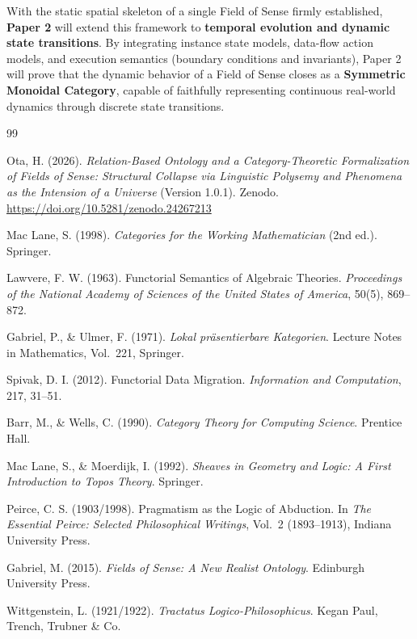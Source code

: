 \documentclass[11pt,a4paper]{article}
\theoremstyle{definition}
\theoremstyle{plain}
\theoremstyle{remark}
\begin{document}
With the static spatial skeleton of a single Field of Sense firmly established, \textbf{Paper 2} will extend this framework to \textbf{temporal evolution and dynamic state transitions}. By integrating instance state models, data-flow action models, and execution semantics (boundary conditions and invariants), Paper 2 will prove that the dynamic behavior of a Field of Sense closes as a \textbf{Symmetric Monoidal Category}, capable of faithfully representing continuous real-world dynamics through discrete state transitions.

\begin{thebibliography}{99}

Ota, H. (2026).
\emph{Relation-Based Ontology and a Category-Theoretic Formalization of Fields of Sense: Structural Collapse via Linguistic Polysemy and Phenomena as the Intension of a Universe} (Version 1.0.1).
Zenodo. \url{https://doi.org/10.5281/zenodo.24267213}

Mac Lane, S. (1998).
\emph{Categories for the Working Mathematician} (2nd ed.).
Springer.

Lawvere, F. W. (1963).
Functorial Semantics of Algebraic Theories.
\emph{Proceedings of the National Academy of Sciences of the United States of America}, 50(5), 869--872.

Gabriel, P., \& Ulmer, F. (1971).
\emph{Lokal pr\"asentierbare Kategorien}.
Lecture Notes in Mathematics, Vol.~221, Springer.

Spivak, D. I. (2012).
Functorial Data Migration.
\emph{Information and Computation}, 217, 31--51.

Barr, M., \& Wells, C. (1990).
\emph{Category Theory for Computing Science}.
Prentice Hall.

Mac Lane, S., \& Moerdijk, I. (1992).
\emph{Sheaves in Geometry and Logic: A First Introduction to Topos Theory}.
Springer.

Peirce, C. S. (1903/1998).
Pragmatism as the Logic of Abduction.
In \emph{The Essential Peirce: Selected Philosophical Writings}, Vol.~2 (1893--1913), Indiana University Press.

Gabriel, M. (2015).
\emph{Fields of Sense: A New Realist Ontology}.
Edinburgh University Press.

Wittgenstein, L. (1921/1922).
\emph{Tractatus Logico-Philosophicus}.
Kegan Paul, Trench, Trubner \& Co.


\end{thebibliography}
\end{document}
